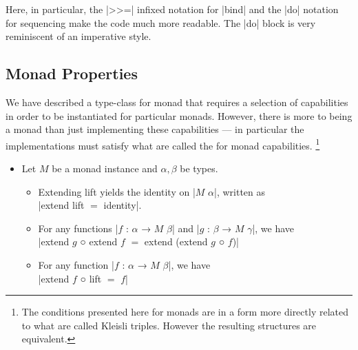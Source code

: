 Here, in particular,
the \code|>>=| infixed notation for \code|bind| and
the \code|do| notation for sequencing make the code much more readable.
The \code|do| block is very reminiscent of an imperative style.



\newpage
\subsection{Monad Properties}

We have described a type-class for monad that requires a selection of capabilities in order to be instantiated for particular monads.
However, there is more to being a monad than just implementing these capabilities --- in particular the implementations must satisfy what are called the  for monad capabilities.%
\footnote{
  The conditions presented here for monads are in a form more directly related to what are called Kleisli triples.
  However the resulting structures are equivalent.
}

\begin{table}[h]
\begin{itemize}
\item[]
Let $M$ be a monad instance and $α, β$ be types.
\begin{itemize}
  \item
    Extending lift yields the identity on \code|$M$ $α$|, written as \\
    \code|extend lift $=$ identity|.
  \item
    For any functions \code|$f$ : $α$ → $M$ $β$| and \code|$g$ : $β$ → $M$ $γ$|, we have \\
    \code|extend $g$ ○ extend $f$ $=$ extend (extend $g$ ○ $f$)|
  \item
    For any function \code|$f$ : $α$ → $M$ $β$|, we have \\
    \code|extend $f$ ○ lift $=$ $f$|
\end{itemize}
\end{itemize}
\end{table}

